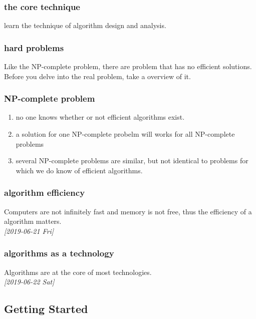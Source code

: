 \documentclass[11pt]{article}
\begin{document}
\subsubsection{the core technique}
\label{sec-2-1-7}
learn the technique of algorithm design and analysis. \\

\subsubsection{hard problems}
\label{sec-2-1-8}
Like the NP-complete problem, there are problem that has no efficient solutions. \\
Before you delve into the real problem, take a overview of it. \\

\subsubsection{NP-complete problem}
\label{sec-2-1-9}
\begin{enumerate}
\item no one knows whether or not efficient algorithms exist. \\
\item a solution for one NP-complete probelm will works for all NP-complete problems \\
\item several NP-complete problems are similar, but not identical to problems for which we do know of efficient algorithms. \\
\end{enumerate}

\subsubsection{algorithm efficiency}
\label{sec-2-1-10}
Computers are not infinitely fast and memory is not free, thus the efficiency of a algorithm matters. \\
\textit{[2019-06-21 Fri]} \\
\subsubsection{algorithms as a technology}
\label{sec-2-1-11}
Algorithms are at the core of most technologies. \\


\textit{[2019-06-22 Sat]} \\
\subsection{Getting Started}
\label{sec-2-2}
\end{document}
